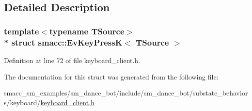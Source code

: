 \subsection{Detailed Description}
\subsubsection*{template$<$typename T\+Source$>$\\*
struct smacc\+::\+Ev\+Key\+Press\+K$<$ T\+Source $>$}



Definition at line 72 of file keyboard\+\_\+client.\+h.



The documentation for this struct was generated from the following file\+:\begin{DoxyCompactItemize}
\item 
smacc\+\_\+sm\+\_\+examples/sm\+\_\+dance\+\_\+bot/include/sm\+\_\+dance\+\_\+bot/substate\+\_\+behaviors/keyboard/\hyperlink{keyboard__client_8h}{keyboard\+\_\+client.\+h}\end{DoxyCompactItemize}

